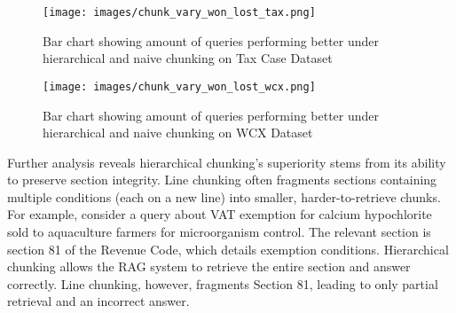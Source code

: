 \begin{figure}[h!]
\centering
\begin{minipage}{0.48\textwidth}
    \centering
    \texttt{[image: images/chunk\_vary\_won\_lost\_tax.png]}  %
    \caption{Bar chart showing amount of queries performing better under hierarchical and naive chunking on Tax Case Dataset}
    \label{fig:chunk_vary_won_lost_tax}
\end{minipage}
\hfill
\begin{minipage}{0.48\textwidth}
    \centering
    \texttt{[image: images/chunk\_vary\_won\_lost\_wcx.png]}  %
    \caption{Bar chart showing amount of queries performing better under hierarchical and naive chunking on WCX Dataset}
    \label{fig:chunk_vary_won_lost_wcx}
\end{minipage}
\label{fig:chunk_vary_won_lost}
\end{figure}


Further analysis reveals hierarchical chunking's superiority stems from its ability to preserve section integrity. Line chunking often fragments sections containing multiple conditions (each on a new line) into smaller, harder-to-retrieve chunks. For example, consider a query about VAT exemption for calcium hypochlorite sold to aquaculture farmers for microorganism control. The relevant section is section 81 of the Revenue Code, which details exemption conditions. Hierarchical chunking allows the RAG system to retrieve the entire section and answer correctly. Line chunking, however, fragments Section 81, leading to only partial retrieval and an incorrect answer.

